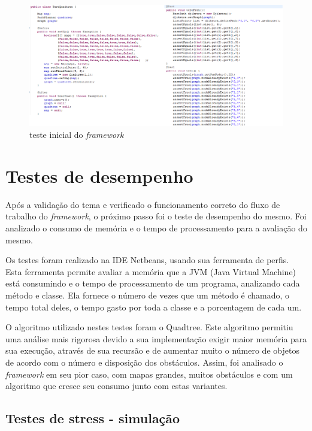 \begin{figure}[h]
	\centering
	\label{fig34}
		\includegraphics[keepaspectratio=true,scale=0.6]{figuras/testeinicial.png}
	\caption{teste inicial do \textit{framework}}
\end{figure}

\section{Testes de desempenho}

Após a validação do tema e verificado o funcionamento correto do fluxo de trabalho do \textit{framework}, o próximo passo foi o teste de desempenho do mesmo. Foi analizado o consumo de memória e o tempo de processamento para a avaliação do mesmo. 

Os testes foram realizado na IDE Netbeans, usando sua ferramenta de perfis. Esta ferramenta permite avaliar a memória que a JVM (Java Virtual Machine) está consumindo e o tempo de processamento de um programa, analizando cada método e classe. Ela fornece o número de vezes que um método é chamado, o tempo total deles, o tempo gasto por toda a classe e a porcentagem de cada um.

O algoritmo utilizado nestes testes foram o Quadtree. Este algoritmo permitiu uma análise mais rigorosa devido a sua implementação exigir maior memória para sua execução, através de sua recursão e de aumentar muito o número de objetos de acordo com o número e disposição dos obstáculos. Assim, foi analisado o \textit{framework} em seu pior caso, com mapas grandes, muitos obstáculos e com um algoritmo que cresce seu consumo junto com estas variantes.

\subsection{Testes de stress - simulação}

